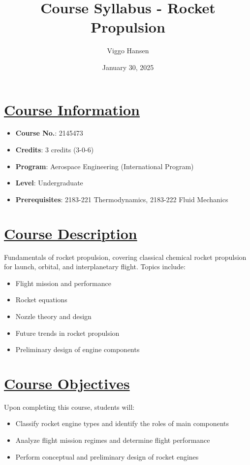 \documentclass[12pt]{article}
\title{Course Syllabus - Rocket Propulsion}
\author{Viggo Hansen}
\date{January 30, 2025}
\begin{document}
\maketitle

\tableofcontents

\section{\hyperref[sec:course_info]{Course Information}}
\label{sec:course_info}
\begin{itemize}
    \item \textbf{Course No.}: 2145473
    \item \textbf{Credits}: 3 credits (3-0-6)
    \item \textbf{Program}: Aerospace Engineering (International Program)
    \item \textbf{Level}: Undergraduate
    \item \textbf{Prerequisites}: 2183-221 Thermodynamics, 2183-222 Fluid Mechanics
\end{itemize}

\section{\hyperref[sec:course_desc]{Course Description}}
\label{sec:course_desc}
Fundamentals of rocket propulsion, covering classical chemical rocket propulsion for launch, orbital, and interplanetary flight. Topics include:
\begin{itemize}
    \item Flight mission and performance
    \item Rocket equations
    \item Nozzle theory and design
    \item Future trends in rocket propulsion
    \item Preliminary design of engine components
\end{itemize}

\section{\hyperref[sec:objectives]{Course Objectives}}
\label{sec:objectives}
Upon completing this course, students will:
\begin{itemize}
    \item Classify rocket engine types and identify the roles of main components
    \item Analyze flight mission regimes and determine flight performance
    \item Perform conceptual and preliminary design of rocket engines
\end{itemize}
\end{document}
